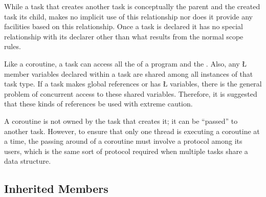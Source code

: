 \documentclass[openright,twoside]{report}
\begin{document}
While a task that creates another task is conceptually the parent and the created task its child, \uC makes no implicit use of this relationship nor does it provide any facilities based on this relationship.
Once a task is declared it has no special relationship with its declarer other than what results from the normal scope rules.

Like a coroutine, a task can access all the  of a \CC program and the .
Also, any \LGinlinetrue\LGbegin\lgrinde\L{}\endlgrinde\LGend{} member variables declared within a task are shared among all instances of that task type.
If a task makes global references or has \LGinlinetrue\LGbegin\lgrinde\L{}\endlgrinde\LGend{} variables, there is the general problem of concurrent access to these shared variables.
Therefore, it is suggested that these kinds of references be used with extreme caution.

\begin{annotation}
A coroutine is not owned by the task that creates it;
it can be ``passed'' to another task.
However, to ensure that only one thread is executing a coroutine at a time, the passing around of a coroutine must involve a protocol among its users, which is the same sort of protocol required when multiple tasks share a data structure.
\end{annotation}


\subsection{Inherited Members}
\label{s:TaskInheritedMembers}
\end{document}
